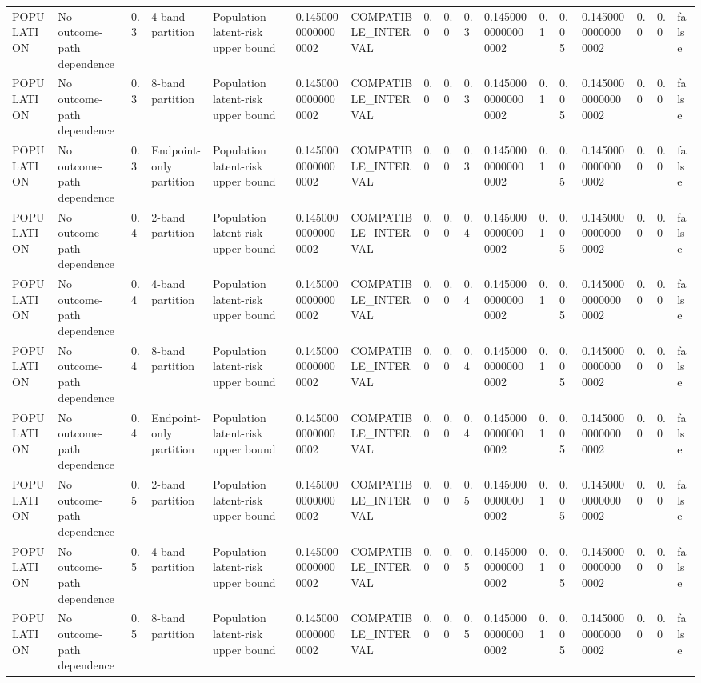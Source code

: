 \begin{tabular}{lllllllllllllllll}
POPULATION & No outcome-path dependence & 0.3 & 4-band partition & Population latent-risk upper bound & 0.14500000000000002 & COMPATIBLE\_INTERVAL & 0.0 & 0.0 & 0.3 & 0.14500000000000002 & 0.1 & 0.05 & 0.14500000000000002 & 0.0 & 0.0 & false \\
POPULATION & No outcome-path dependence & 0.3 & 8-band partition & Population latent-risk upper bound & 0.14500000000000002 & COMPATIBLE\_INTERVAL & 0.0 & 0.0 & 0.3 & 0.14500000000000002 & 0.1 & 0.05 & 0.14500000000000002 & 0.0 & 0.0 & false \\
POPULATION & No outcome-path dependence & 0.3 & Endpoint-only partition & Population latent-risk upper bound & 0.14500000000000002 & COMPATIBLE\_INTERVAL & 0.0 & 0.0 & 0.3 & 0.14500000000000002 & 0.1 & 0.05 & 0.14500000000000002 & 0.0 & 0.0 & false \\
POPULATION & No outcome-path dependence & 0.4 & 2-band partition & Population latent-risk upper bound & 0.14500000000000002 & COMPATIBLE\_INTERVAL & 0.0 & 0.0 & 0.4 & 0.14500000000000002 & 0.1 & 0.05 & 0.14500000000000002 & 0.0 & 0.0 & false \\
POPULATION & No outcome-path dependence & 0.4 & 4-band partition & Population latent-risk upper bound & 0.14500000000000002 & COMPATIBLE\_INTERVAL & 0.0 & 0.0 & 0.4 & 0.14500000000000002 & 0.1 & 0.05 & 0.14500000000000002 & 0.0 & 0.0 & false \\
POPULATION & No outcome-path dependence & 0.4 & 8-band partition & Population latent-risk upper bound & 0.14500000000000002 & COMPATIBLE\_INTERVAL & 0.0 & 0.0 & 0.4 & 0.14500000000000002 & 0.1 & 0.05 & 0.14500000000000002 & 0.0 & 0.0 & false \\
POPULATION & No outcome-path dependence & 0.4 & Endpoint-only partition & Population latent-risk upper bound & 0.14500000000000002 & COMPATIBLE\_INTERVAL & 0.0 & 0.0 & 0.4 & 0.14500000000000002 & 0.1 & 0.05 & 0.14500000000000002 & 0.0 & 0.0 & false \\
POPULATION & No outcome-path dependence & 0.5 & 2-band partition & Population latent-risk upper bound & 0.14500000000000002 & COMPATIBLE\_INTERVAL & 0.0 & 0.0 & 0.5 & 0.14500000000000002 & 0.1 & 0.05 & 0.14500000000000002 & 0.0 & 0.0 & false \\
POPULATION & No outcome-path dependence & 0.5 & 4-band partition & Population latent-risk upper bound & 0.14500000000000002 & COMPATIBLE\_INTERVAL & 0.0 & 0.0 & 0.5 & 0.14500000000000002 & 0.1 & 0.05 & 0.14500000000000002 & 0.0 & 0.0 & false \\
POPULATION & No outcome-path dependence & 0.5 & 8-band partition & Population latent-risk upper bound & 0.14500000000000002 & COMPATIBLE\_INTERVAL & 0.0 & 0.0 & 0.5 & 0.14500000000000002 & 0.1 & 0.05 & 0.14500000000000002 & 0.0 & 0.0 & false \\

\end{tabular}
